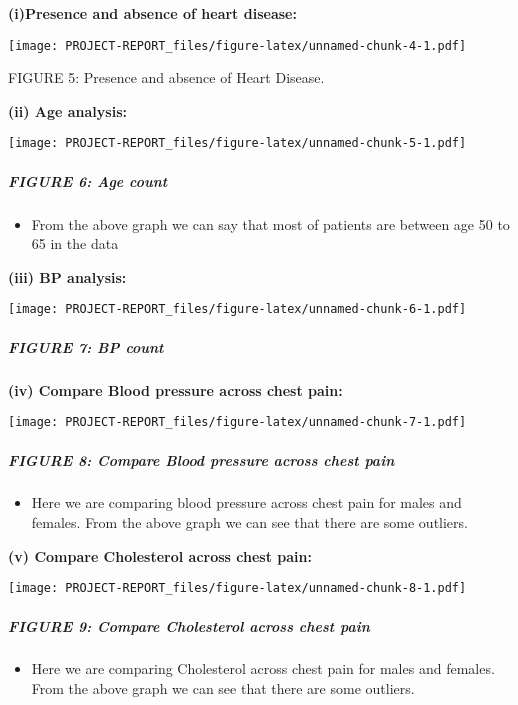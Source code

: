 \documentclass[
]{article}
\providecommand{\tightlist}{%
  \setlength{\itemsep}{0pt}\setlength{\parskip}{0pt}}
\begin{document}
\textbf{(i)Presence and absence of heart disease:}

\texttt{[image: PROJECT-REPORT\_files/figure-latex/unnamed-chunk-4-1.pdf]}

FIGURE 5: Presence and absence of Heart Disease.

\textbf{(ii) Age analysis:}

\texttt{[image: PROJECT-REPORT\_files/figure-latex/unnamed-chunk-5-1.pdf]}

\hypertarget{figure-6-age-count}{%
\subparagraph{FIGURE 6: Age count}\label{figure-6-age-count}}

\begin{itemize}
\tightlist
\item
  From the above graph we can say that most of patients are between age
  50 to 65 in the data
\end{itemize}

\textbf{(iii) BP analysis:}

\texttt{[image: PROJECT-REPORT\_files/figure-latex/unnamed-chunk-6-1.pdf]}

\hypertarget{figure-7-bp-count}{%
\subparagraph{FIGURE 7: BP count}\label{figure-7-bp-count}}

\textbf{(iv) Compare Blood pressure across chest pain:}

\texttt{[image: PROJECT-REPORT\_files/figure-latex/unnamed-chunk-7-1.pdf]}

\hypertarget{figure-8-compare-blood-pressure-across-chest-pain}{%
\subparagraph{FIGURE 8: Compare Blood pressure across chest
pain}\label{figure-8-compare-blood-pressure-across-chest-pain}}

\begin{itemize}
\tightlist
\item
  Here we are comparing blood pressure across chest pain for males and
  females. From the above graph we can see that there are some outliers.
\end{itemize}

\textbf{(v) Compare Cholesterol across chest pain:}

\texttt{[image: PROJECT-REPORT\_files/figure-latex/unnamed-chunk-8-1.pdf]}

\hypertarget{figure-9-compare-cholesterol-across-chest-pain}{%
\subparagraph{FIGURE 9: Compare Cholesterol across chest
pain}\label{figure-9-compare-cholesterol-across-chest-pain}}

\begin{itemize}
\tightlist
\item
  Here we are comparing Cholesterol across chest pain for males and
  females. From the above graph we can see that there are some outliers.
\end{itemize}
\end{document}
